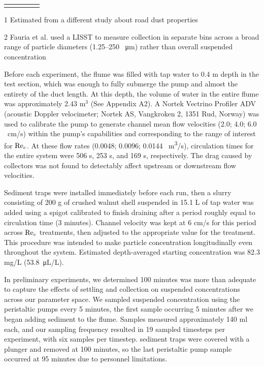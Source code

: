 \documentclass[geosciences,article,submit,moreauthors,pdftex]{Definitions/mdpi}
\begin{document}
\begin{table}[H]
\begin{threeparttable}
\begin{tabular}{lcccc}
\bottomrule
\vspace{-4mm}
\end{tabular}
\begin{tablenotes}
\footnotesize \item[1] Estimated from a different study about road dust properties \cite{mckenzie2008size} 
\vspace{2mm}
\footnotesize \item[2] Fauria et al. \cite{Fauria_2015} used a LISST to measure collection in separate bins across a broad range of particle diameters (1.25--250 \SI{}{\micro\metre}) rather than overall suspended concentration
\end{tablenotes}
\end{threeparttable}
\label{tbl:parameters}
\end{table}

Before each experiment, the flume was filled with tap water to 0.4 m depth in the test section, which was enough to fully submerge the pump and almost the entirety of the duct length. At this depth, the volume of water in the entire flume was approximately 2.43 m$^3$ (See Appendix A2).  A Nortek Vectrino Profiler ADV (acoustic Doppler velocimeter; Nortek AS, Vangkroken 2, 1351 Rud, Norway) was used to calibrate the pump to generate channel mean flow velocities (2.0; 4.0; 6.0 \SI{}{\centi\metre/\second}) within the pump's capabilities and corresponding to the range of interest for $\mathrm{Re}_c$. At these flow rates (0.0048; 0.0096; 0.0144 \SI{}{\metre\cubed/\second}), circulation times for the entire system were 506 s, 253 s, and 169 s, respectively. The drag caused by collectors was not found to detectably affect upstream or downstream flow velocities.

Sediment traps were installed immediately before each run, then a slurry consisting of 200 g of crushed walnut shell suspended in 15.1 L of tap water was added using a spigot calibrated to finish draining after a period roughly equal to circulation time (3 minutes). Channel velocity was kept at 6 cm/s for this period across $\mathrm{Re}_c$ treatments, then adjusted to the appropriate value for the treatment. This procedure was intended to make particle concentration longitudinally even throughout the system. Estimated depth-averaged starting concentration was 82.3 mg/L (\SI{53.8}{\micro\liter/\liter}).

In preliminary experiments, we determined 100 minutes was more than adequate to capture the effects of settling and collection on suspended concentrations across our parameter space. We sampled suspended concentration using the peristaltic pumps every 5 minutes, the first sample occurring 5 minutes after we began adding sediment to the flume. Samples measured approximately 140 ml each, and our sampling frequency resulted in 19 sampled timesteps per experiment, with six samples per timestep. sediment traps were covered with a plunger and removed at 100 minutes, so the last peristaltic pump sample occurred at 95 minutes due to personnel limitations.
\end{document}

